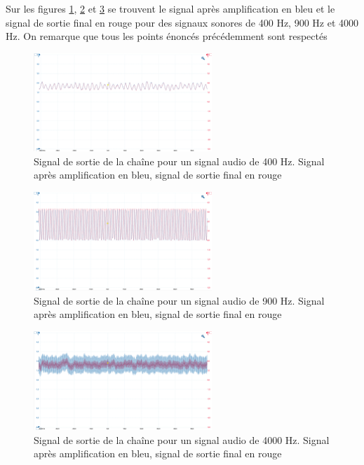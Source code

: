 Sur les figures \ref{fig:sortie400}, \ref{fig:sortie900} et \ref{fig:sortie4000} se trouvent le signal après amplification en bleu et le signal de sortie final en rouge pour des signaux sonores de 400 Hz, 900 Hz et 4000 Hz. On remarque que tous les points énoncés précédemment sont respectés

\begin{figure}[H]
    \centering
    \includegraphics[width=0.6\textwidth]{Pictures/400Hz.png}
    \caption{Signal de sortie de la chaîne pour un signal audio de 400 Hz. Signal après amplification en bleu, signal de sortie final en rouge}
    \label{fig:sortie400}
\end{figure}

\begin{figure}[H]
    \centering
    \includegraphics[width=0.6\textwidth]{Pictures/900Hz.png}
    \caption{Signal de sortie de la chaîne pour un signal audio de 900 Hz. Signal après amplification en bleu, signal de sortie final en rouge}
    \label{fig:sortie900}
\end{figure}

\begin{figure}[H]
    \centering
    \includegraphics[width=0.6\textwidth]{Pictures/4000Hz.png}
    \caption{Signal de sortie de la chaîne pour un signal audio de 4000 Hz. Signal après amplification en bleu, signal de sortie final en rouge}
    \label{fig:sortie4000}
\end{figure}

